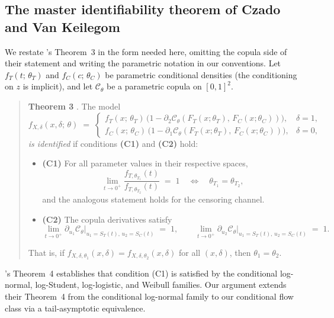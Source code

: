 \subsection{The master identifiability theorem of Czado and Van Keilegom}
\label{app:czado-vk}

We restate \citet{czado2023dependent}'s Theorem~3 in the form needed
here, omitting the copula side of their statement and writing the
parametric notation in our conventions. Let $f_T(t;\, \theta_T)$ and
$f_C(c;\, \theta_C)$ be parametric conditional densities (the
conditioning on $z$ is implicit), and let $\mathcal{C}_\theta$ be a
parametric copula on $[0, 1]^2$.

\begin{quote}
\textbf{Theorem 3} \citep{czado2023dependent}.
The model
\[
    f_{X, \delta}(x, \delta;\, \theta)
    \;=\; \begin{cases}
        f_T(x;\, \theta_T)\,
            \big(1 - \partial_2 \mathcal{C}_\theta(F_T(x; \theta_T),\, F_C(x; \theta_C))\big),
            & \delta = 1, \\[3pt]
        f_C(x;\, \theta_C)\,
            \big(1 - \partial_1 \mathcal{C}_\theta(F_T(x; \theta_T),\, F_C(x; \theta_C))\big),
            & \delta = 0,
    \end{cases}
\]
\emph{is identified} if conditions \textbf{(C1)} and \textbf{(C2)} hold:
\begin{itemize}
    \item \textbf{(C1)} For all parameter values in their respective
        spaces,
        \[
            \lim_{t \to 0^+} \frac{f_{T, \theta_{T_1}}(t)}{f_{T, \theta_{T_2}}(t)} \;=\; 1
            \quad\Longleftrightarrow\quad \theta_{T_1} = \theta_{T_2},
        \]
        and the analogous statement holds for the censoring channel.

    \item \textbf{(C2)} The copula derivatives satisfy
        \[
            \lim_{t \to 0^+} \partial_{u_1} \mathcal{C}_\theta\big|_{u_1 = S_T(t),\, u_2 = S_C(t)} \;=\; 1,
            \qquad
            \lim_{t \to 0^+} \partial_{u_2} \mathcal{C}_\theta\big|_{u_1 = S_T(t),\, u_2 = S_C(t)} \;=\; 1.
        \]
\end{itemize}
That is, if $f_{X, \delta, \theta_1}(x, \delta) = f_{X, \delta, \theta_2}(x, \delta)$
for all $(x, \delta)$, then $\theta_1 = \theta_2$.
\end{quote}

\citeauthor{czado2023dependent}'s Theorem~4 establishes that
condition (C1) is satisfied by the conditional log-normal,
log-Student, log-logistic, and Weibull families. Our argument extends
their Theorem~4 from the conditional log-normal family to our
conditional flow class via a tail-asymptotic equivalence.

